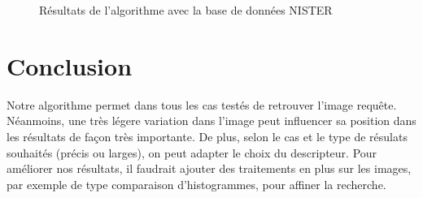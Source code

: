 \documentclass{article}
\begin{document}
\begin{figure}[!ht]%
  \centering
  \hspace{0.01\textwidth}
  \caption{Résultats de l'algorithme avec la base de données NISTER}
  \label{db}
\end{figure}

\section{Conclusion}

Notre algorithme permet dans tous les cas testés de retrouver l'image requête. Néanmoins, une très légere variation dans l'image peut influencer 
sa position dans les résultats de façon très importante. 
De plus, selon le cas et le type de résulats souhaités (précis ou larges), on peut adapter le choix du descripteur.
Pour améliorer nos résultats, il faudrait ajouter des traitements en plus sur les images, par exemple de type comparaison d'histogrammes, pour affiner la recherche.
\end{document}
